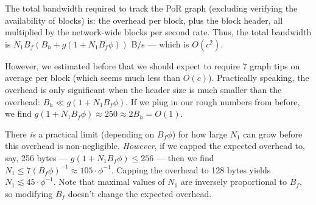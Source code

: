 The total bandwidth required to track the PoR graph (excluding verifying the availability of blocks) is: the overhead per block, plus the block header, all multiplied by the network-wide blocks per second rate.
Thus, the total bandwidth is $N_1 B_f (B_h + g(1 + N_1 B_f \phi))$ B/s --- which is $O(c^2)$.

However, we estimated before that we should expect to require 7 graph tips on average per block (which seems much less than $O(c)$).
Practically speaking, the overhead is only significant when the header size is much smaller than the overhead: $B_h \ll g (1 + N_1 B_f \phi)$.
If we plug in our rough numbers from before, we find $g (1 + N_1 B_f \phi) \approx 250 \approx 2 B_h = O(1)$.

There \emph{is} a practical limit (depending on $B_f \phi$) for how large $N_1$ can grow before this overhead is non-negligible.
\emph{However}, if we capped the expected overhead to, say, 256 bytes --- $g (1 + N_1 B_f \phi) \le 256$ --- then we find $N_1 \le 7(B_f \phi)^{-1} \approx 105 \cdot \phi^{-1}$.
Capping the overhead to 128 bytes yields $N_1 \lesssim 45 \cdot \phi^{-1}$.
Note that maximal values of $N_1$ are inversely proportional to $B_f$, so modifying $B_f$ doesn't change the expected overhead.






